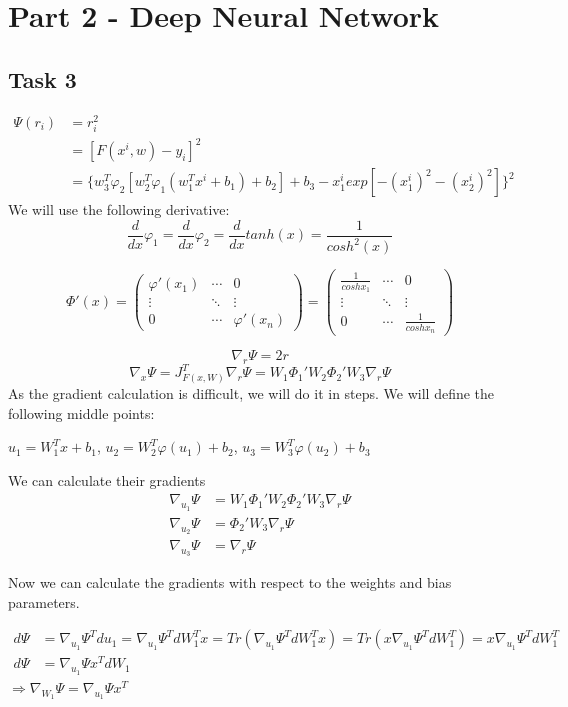 \documentclass[12pt]{scrartcl}
\begin{document}
\section*{Part 2 - Deep Neural Network}
\subsection*{Task 3}
\begin{align*}
\Psi(r_i)&=r_i^2\\
&=[F(x^i,w)-y_i]^2\\
&=\{w_3^T\varphi_2[w_2^T\varphi_1(w_1^Tx^i+b_1)+b_2]+b_3 -x_1^i exp[-(x_1^i)^2-(x_2^i)^2]\}^2
\end{align*}
We will use the following derivative:
$$\frac{d}{dx}\varphi_1=\frac{d}{dx}\varphi_2=\frac{d}{dx}tanh(x)=
\frac{1}{cosh^2(x)}$$

$$\Phi'(x)=
\begin{pmatrix}
\varphi'(x_1) & \cdots & 0 \\
\vdots & \ddots & \vdots \\
0 & \cdots & \varphi'(x_n)
\end{pmatrix}
=
\begin{pmatrix}
\frac{1}{cosh x_1} & \cdots & 0 \\
\vdots & \ddots & \vdots \\
0 & \cdots & \frac{1}{cosh x_n}
\end{pmatrix}$$

$$\nabla_r \Psi = 2r$$
$$\nabla_x \Psi = J^T_{F(x, W)}\nabla_r \Psi = 
W_1\Phi_1'W_2\Phi_2'W_3\nabla_r \Psi$$
As the gradient calculation is difficult, we will do it in steps. We will define the following middle points:
\begin{center}
$u_1 = W_1^Tx+b_1$, $u_2 = W_2^T\varphi(u_1)+b_2$, $u_3 = W_3^T\varphi(u_2)+b_3$
\end{center}
We can calculate their gradients
\begin{align*}
\nabla_{u_1} \Psi &= W_1\Phi_1'W_2\Phi_2'W_3\nabla_r \Psi \\
\nabla_{u_2} \Psi &= \Phi_2'W_3\nabla_r \Psi \\
\nabla_{u_3} \Psi &= \nabla_r \Psi
\end{align*}

Now we can calculate the gradients with respect to the weights and bias parameters.

\begin{align*}
d\Psi &= \nabla_{u_1}\Psi^Tdu_1=\nabla_{u_1}\Psi^T dW_1^Tx
=Tr(\nabla_{u_1}\Psi^T dW_1^Tx)=Tr(x\nabla_{u_1}\Psi^T dW_1^T)
=x\nabla_{u_1}\Psi^T dW_1^T\\
d\Psi &= \nabla_{u_1}\Psi x^TdW_1 
\end{align*}
$\Rightarrow \nabla_{W_1}\Psi = \nabla_{u_1}\Psi x^T$
\begin{center}
\end{center}
\end{document}
